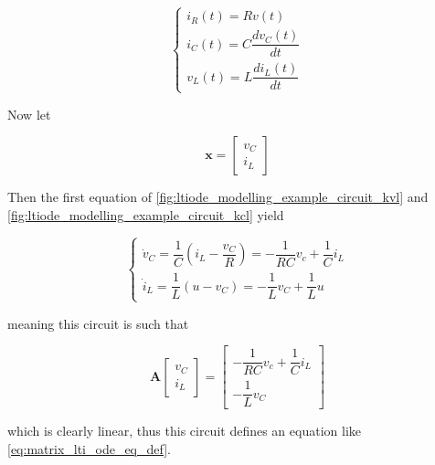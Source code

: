 \begin{example}
\begin{equation}
	\left\{\begin{array}{l}
		i_R(t) = Rv(t) \\[3mm]
		i_C(t) = C \dfrac{dv_C(t)}{dt} \\[3mm]
		v_L(t) = L\dfrac{di_L(t)}{dt}
	\end{array}\right. \label{fig:ltiode_modelling_example_circuit_components}
\end{equation}

	Now let

\begin{equation} \mathbf{x} = \left[\begin{array}{c} v_C \\[3mm] i_L \end{array}\right] \end{equation}

	Then the first equation of \eqref{fig:ltiode_modelling_example_circuit_kvl} and \eqref{fig:ltiode_modelling_example_circuit_kcl} yield

\begin{equation} \left\{ \begin{array}{l} \dot{v}_C = \dfrac{1}{C} \left(i_L - \dfrac{v_C}{R}\right) = -\dfrac{1}{RC}v_c + \dfrac{1}{C}i_L \\[5mm] \dot{i}_L = \dfrac{1}{L} \left(u - v_C\right) = - \dfrac{1}{L}v_C + \dfrac{1}{L}u \end{array}\right.\end{equation}

	\noindent meaning this circuit is such that

\begin{equation} \mathbf{A}\left[ \begin{array}{l} v_C \\[3mm] i_L \end{array}\right] = \left[\begin{array}{c} -\dfrac{1}{RC}v_c + \dfrac{1}{C}i_L \\[5mm] - \dfrac{1}{L}v_C \end{array}\right]\end{equation}

	\noindent which is clearly linear, thus this circuit defines an equation like \eqref{eq:matrix_lti_ode_eq_def}.

\examplebar
\end{example} %

